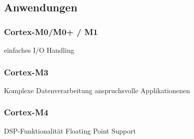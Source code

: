 \subsection{Anwendungen}
\begin{multicols}{3}
    \begin{minipage}{\linewidth}
       \subsubsection{Cortex-M0/M0+ / M1}  
       einfaches I/O Handling 
    \end{minipage}
    
    \begin{minipage}{\linewidth}
        \subsubsection{Cortex-M3}   
        Komplexe Datenverarbeitung\newline
        anspruchsvolle Applikationenen
    \end{minipage}

    \begin{minipage}{\linewidth}
        \subsubsection{Cortex-M4}   
        DSP-Funktionalität\newline
        Floating Point Support
    \end{minipage}
\end{multicols}
    

